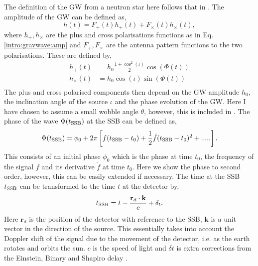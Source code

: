 The definition of the \ac{GW} from a neutron star here follows that in \citep{schutz1998DataAnalysis,riles2017RecentSearches,dupuis2005BayesianEstimation}. The amplitude of the \ac{GW} can be defined as,
\begin{equation}
\label{intro:cw:ht}
h(t) = F_+(t)h_{+}(t) +F_{\times}(t)h_{\times}(t),
\end{equation}
where $h_{+},h_{\times}$ are the plus and cross polarisations functions as in Eq.\ref{intro:gravwave:amp}  and $F_{+},F_{\times}$ are the antenna pattern functions to the two polarisations.
These are defined by,
\begin{equation}
\label{intro:cw:amplitudes}
    \begin{split}
        h_{+}(t) &=  h_0 \frac{1 + \cos^2{(\iota)}}{2}\cos{\left(\Phi(t)\right)} \\
        h_{\times}(t) &= h_0  \cos{(\iota)} \sin{\left( \Phi(t)\right) } \\
    \end{split}
\end{equation}
The plus and cross polarised components then depend on the \ac{GW} amplitude $h_0$, the inclination angle of the source $\iota$ and the phase evolution of the \ac{GW}. Here I have chosen to assume a small wobble angle $\theta$, however, this is included in \citep{schutz1998DataAnalysis}. The phase of the wave $\Phi(t_{{\rm SSB}})$ at the \ac{SSB} can be defined as,
\begin{equation}
\label{searchcw:model:phase}
    \Phi(t_{{\rm SSB}}) = \phi_0 + 2\pi\left[ f(t_{{\rm SSB}} - t_0) + \frac{1}{2} \dot{f} (t_{{\rm SSB}} - t_0)^2 + .....\right] .
\end{equation}
This consists of an initial phase $\phi_0$ which is the phase at time $t_0$, the frequency of the signal $f$ and its derivative ${\dot{f}}$ at time $t_0$. Here we show the phase to second order, however, this can be easily extended if necessary. 
The time at the \ac{SSB} $t_{{\rm SSB}}$ can be transformed to the time $t$ at the detector by,
\begin{equation}
t_{{\rm SSB}} = t - \frac{\mathbf{r}_d \cdot \mathbf{k}}{c} + \delta_t.
\end{equation}
Here $\mathbf{r}_d$ is the position of the detector with reference to the \ac{SSB}, $\mathbf{k}$ is a unit vector in the direction of the source. This essentially takes into account the Doppler shift of the signal due to the movement of the detector, i.e. as the earth rotates and orbits the sun. $c$ is the speed of light and $\delta t$ is extra corrections from the Einstein, Binary and Shapiro delay \citep{}.
